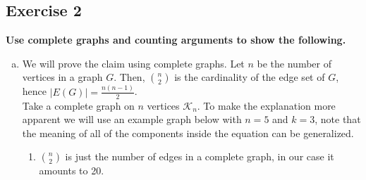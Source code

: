 \subsection*{Exercise 2}
\textbf{Use complete graphs and counting arguments to show the following.}
\begin{enumerate}[a)]
    \item We will prove the claim using complete graphs. Let $n$ be the number of vertices in a graph $G$. Then, $\binom{n}{2}$ is the cardinality of the edge set of $G$, hence $|E(G)| = \frac{n(n-1)}{2}$. \\
    \linebreak 
    Take a complete graph on $n$ vertices $\mathcal{K}_n$. To make the explanation more apparent we will use an example graph below with $n = 5$ and $k = 3$, note that the meaning of all of the components inside the equation can be generalized.
\begin{enumerate}
    \item $\binom{n}{2}$ is just the number of edges in a complete graph, in our case it amounts to 20.
        \begin{center}
\end{center}
\end{enumerate}
\end{enumerate}
